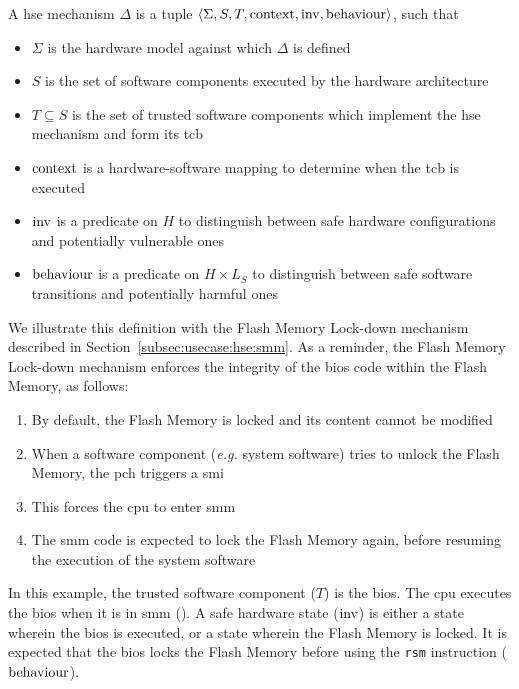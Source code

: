 \begin{definition}
  \label{def:speccert:hse}
  A \ac{hse} mechanism $\Delta$ is a tuple
  $\langle \Sigma, S, T, \mathrm{context}, \mathrm{inv}, \mathrm{behaviour} \rangle$,
  such that
  \begin{itemize}
  \item $\Sigma$ is the hardware model against which $\Delta$ is defined
  \item $S$ is the set of software components executed by the hardware
    architecture
  \item $T \subseteq S$ is the set of trusted software components which
    implement the \ac{hse} mechanism and form its \ac{tcb}
  \item $\mathrm{context}$ is a hardware-software mapping to determine when the
    \ac{tcb} is executed
  \item $\mathrm{inv}$ is a predicate on $H$ to distinguish between safe hardware
    configurations and potentially vulnerable ones
  \item $\mathrm{behaviour}$ is a predicate on $H \times L_S$ to distinguish
    between safe software transitions and potentially harmful ones
  \end{itemize}
\end{definition}

We illustrate this definition with the Flash Memory Lock-down mechanism
described in Section~\ref{subsec:usecase:hse:smm}.
%
As a reminder, the Flash Memory Lock-down mechanism enforces the integrity of
the \ac{bios} code within the Flash Memory, as follows:
%
\begin{enumerate}
\item By default, the Flash Memory is locked and its content cannot be modified
%
\item When a software component (\emph{e.g.} system software) tries to unlock
  the Flash Memory, the \ac{pch} triggers a \ac{smi}
%
\item This forces the \ac{cpu} to enter \ac{smm}
%
\item The \ac{smm} code is expected to lock the Flash Memory again, before
  resuming the execution of the system software
\end{enumerate}

\begin{example}
  \label{example:speccert:flashdef}
  In this example, the trusted software component ($T$) is the \ac{bios}.
  The \ac{cpu} executes the \ac{bios} when it is in \ac{smm} ().
  A safe hardware state ($\mathrm{inv}$) is either a state wherein the \ac{bios}
  is executed, or a state wherein the Flash Memory is locked.
  It is expected that the \ac{bios} locks the Flash Memory before using the
  \texttt{rsm} instruction ($\mathrm{behaviour}$).
\end{example}

